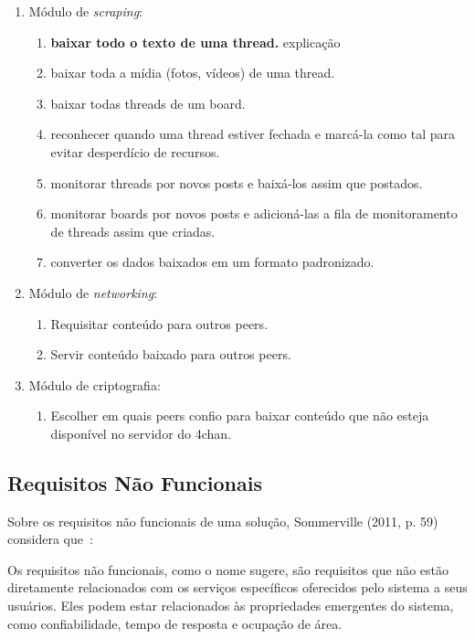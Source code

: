 \begin{enumerate}
    \item Módulo de \textit{scraping}:
    \begin{enumerate}
        \item \textbf{baixar todo o texto de uma thread.} explicação 
        \item baixar toda a mídia (fotos, vídeos) de uma thread.
        \item baixar todas threads de um board.
        \item reconhecer quando uma thread estiver fechada e marcá-la como tal para evitar desperdício de recursos.
        \item monitorar threads por novos posts e baixá-los assim que postados.
        \item monitorar boards por novos posts e adicioná-las a fila de monitoramento de threads assim que criadas.
        \item converter os dados baixados em um formato padronizado.
    \end{enumerate}
    \item Módulo de \textit{networking}:
    \begin{enumerate}
        \item Requisitar conteúdo para outros peers.
        \item Servir conteúdo baixado para outros peers.
    \end{enumerate}
    \item Módulo de criptografia:
    \begin{enumerate}
        \item Escolher em quais peers confio para baixar conteúdo que não esteja disponível no servidor do 4chan.
    \end{enumerate}
\end{enumerate}

\subsection{Requisitos Não Funcionais}

Sobre os requisitos não funcionais de uma solução, Sommerville (2011, p. 59) considera que~\cite{SOMMERVILLE1}:

\begin{directcite}
Os requisitos não funcionais, como o nome sugere, são requisitos
que não estão diretamente relacionados com os serviços específicos
oferecidos pelo sistema a seus usuários.
Eles podem estar
relacionados às propriedades emergentes do sistema, como
confiabilidade, tempo de resposta e ocupação de área.
\end{directcite}

